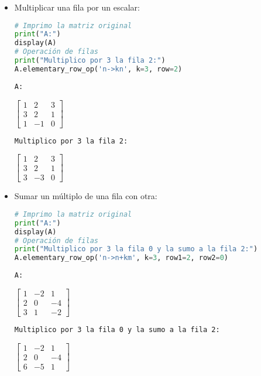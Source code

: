 \documentclass[a4,11pt]{aleph-notas}
\begin{document}
\begin{itemize}
\item
    Multiplicar una fila por un escalar:
\begin{pycodigo}
    \begin{ipynbcodigo}\begin{lstlisting}[language=Python]
# Imprimo la matriz original
print("A:")
display(A)
# Operación de filas
print("Multiplico por 3 la fila 2:")
A.elementary_row_op('n->kn', k=3, row=2)
    \end{lstlisting}\end{ipynbcodigo}
    \begin{ipynbsalida}
    \begin{Verbatim}
A:
    \end{Verbatim}
    $\displaystyle \left[\begin{matrix}1 & 2 & 3\\3 & 2 & 1\\1 & -1 & 0\end{matrix}\right]$
    \begin{Verbatim}
Multiplico por 3 la fila 2:
    \end{Verbatim}
    $\displaystyle \left[\begin{matrix}1 & 2 & 3\\3 & 2 & 1\\3 & -3 & 0\end{matrix}\right]$
    \end{ipynbsalida}
\end{pycodigo}

\item
    Sumar un múltiplo de una fila con otra:
\begin{pycodigo}
    \begin{ipynbcodigo}\begin{lstlisting}[language=Python]
# Imprimo la matriz original
print("A:")
display(A)
# Operación de filas
print("Multiplico por 3 la fila 0 y la sumo a la fila 2:")
A.elementary_row_op('n->n+km', k=3, row1=2, row2=0)
    \end{lstlisting}\end{ipynbcodigo}
    \begin{ipynbsalida}
    \begin{Verbatim}
A:
    \end{Verbatim}
    $\displaystyle \left[\begin{matrix}1 & -2 & 1\\2 & 0 & -4\\3 & 1 & -2\end{matrix}\right]$
    \begin{Verbatim}
Multiplico por 3 la fila 0 y la sumo a la fila 2:
    \end{Verbatim}
    $\displaystyle \left[\begin{matrix}1 & -2 & 1\\2 & 0 & -4\\6 & -5 & 1\end{matrix}\right]$
    \end{ipynbsalida}
\end{pycodigo}

\end{itemize}
\end{document}
